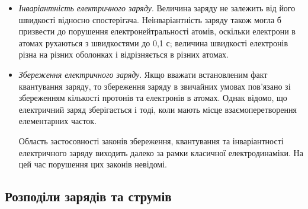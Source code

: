 \begin{itemize}
\item \textit{Інваріантність електричного заряду}. Величина заряду не залежить від
його швидкості відносно спостерігача. Неінваріантність заряду також могла б
призвести до порушення електронейтральності атомів, оскільки електрони в
атомах рухаються з швидкостями до 0,1 с; величина швидкості електронів
різна на різних оболонках і відрізняється в різних атомах.



\item \textit{Збереження електричного заряду}. Якщо вважати встановленим факт
квантування заряду, то збереження заряду в звичайних умовах пов’язано зі
збереженням кількості протонів та електронів в атомах. Однак відомо, що
електричний заряд зберігається і тоді, коли мають місце взаємоперетворення
елементарних часток.

Область застосовності законів збереження, квантування та інваріантності
електричного заряду виходить далеко за рамки класичної електродинаміки. На
цей час порушення цих законів невідомі.

\end{itemize}

\subsection*{Розподіли зарядів та струмів}

